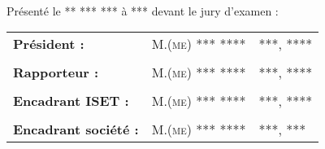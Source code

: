 \begin{titlepage}
\begin{center}
        \HRule \\%
    \end{center}
    \begin{center}
        Présenté le ** *** *** à *** devant le jury d'examen :\\
    \end{center}
    \begin{center}
        \begin{tabular}{lll}
         \tabularnewline
            \textbf{Président :}               & \textsc{M.(me) *** ****} & ***, \textsc{****}
            \tabularnewline
            \tabularnewline
            \textbf{Rapporteur :}              & \textsc{M.(me) *** ****} & ***, \textsc{****}
            \tabularnewline
            \tabularnewline
            \textbf{Encadrant \textsc{ISET} :} & \textsc{M.(me) *** ****} & ***, \textsc{****}
            \tabularnewline
            \tabularnewline
            \textbf{Encadrant société :}       & \textsc{M.(me) *** ****} & ***, \textsc{***}
        \end{tabular}
    \end{center}
    \sloppy
\end{titlepage}
